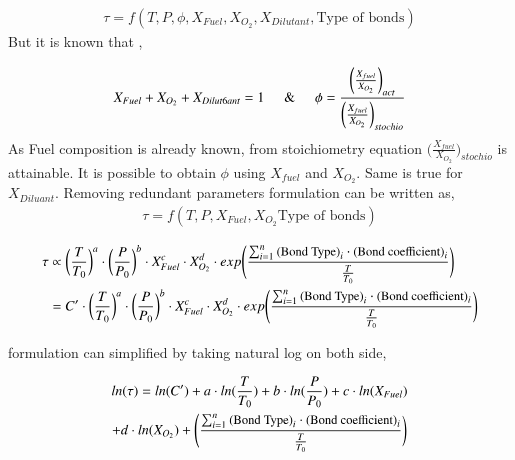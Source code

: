 \documentclass[preprint,12pt]{elsarticle}
\begin{document}
		  \begin{equation}
		  \begin{aligned}
\tau = f(T,P,\phi,X_{Fuel},X_{O_2},X_{Dilutant},\text{Type of bonds})
		  \end{aligned}
		  \end{equation}
		 \hspace{0.25cm}But it is known that ,
		 
		 \begin{equation}
		 \begin{aligned}
			X_{Fuel}+X_{O_2}+X_{Dilut6ant} = 1
			 \hspace{0.5cm} \& \hspace{0.5cm}
		 \phi = \frac{\bigg(\frac{X_{fuel}}{X_{O_2}}\bigg)_{act}}{\bigg(\frac{X_{fuel}}{X_{O_2}}\bigg)_{stochio}}
	 	\end{aligned}
	 	\end{equation}
	 	As Fuel composition is already known, from stoichiometry equation  $\bigg(\frac{X_{fuel}}{X_{O_2}}\bigg)_{stochio}$ is attainable. It is possible to obtain $\phi$ using $X_{fuel}$ and $X_{O_2}$. Same is true for $X_{Diluant}$.  Removing redundant parameters formulation can be written  as,
	 	\begin{equation}\label{eq:func}
	 	\begin{aligned}
	 	\tau = f(T,P,X_{Fuel},X_{O_2}\text{Type of bonds})
	 	\end{aligned} 
	 	\end{equation}
	 	
	 		\begin{equation}
	 		\begin{aligned}
	 		\tau &\propto \bigg(\frac{T}{T_0}\bigg)^a \cdot \bigg(\frac{P}{P_0}\bigg)^b  \cdot X_{Fuel}^c    \cdot X_{O_2}^d    \cdot exp\Bigg(\small{\frac{ \sum_{i=1}^{n}\text{(Bond Type)}_i \cdot \text{(Bond coefficient)}_i}{\frac{T}{T_0}}} \Bigg) \\
	 		&= C' \cdot \bigg(\frac{T}{T_0}\bigg)^a \cdot \bigg(\frac{P}{P_0}\bigg)^b   \cdot X_{Fuel}^c    \cdot X_{O_2}^d    \cdot exp\Bigg(\small{\frac{ \sum_{i=1}^{n}\text{(Bond Type)}_i \cdot \text{(Bond coefficient)}_i}{\frac{T}{T_0}}} \Bigg) \\
	 		\end{aligned}
	 		\end{equation}
	 		
	 	formulation can simplified by taking natural log on both side,
		
		\begin{multline}
		ln(\tau) = ln(C') + a \cdot ln(\frac{T}{T_0}) + b \cdot ln(\frac{P}{P_0})+ c \cdot ln(X_{Fuel}) \\+    d \cdot ln(X_{O_2}) +  \Bigg(\small{\frac{ \sum_{i=1}^{n}\text{(Bond Type)}_i \cdot \text{(Bond coefficient)}_i}{\frac{T}{T_0}}} \Bigg) 
		\end{multline}
		
\end{document}
